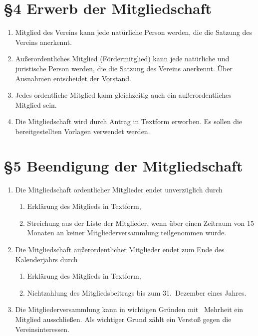 \documentclass[11pt,ngerman]{article}
\begin{document}
\section*{§4 Erwerb der Mitgliedschaft}
\begin{enumerate}
	\item Mitglied des Vereins kann jede natürliche Person werden, die die Satzung des Vereins anerkennt.
	\item Außerordentliches Mitglied (\glqq Fördermitglied\grqq) kann jede natürliche und juristische Person werden, die die Satzung des Vereins anerkennt.
	Über Ausnahmen entscheidet der Vorstand.
	\item Jedes ordentliche Mitglied kann gleichzeitig auch ein außerordentliches Mitglied sein.
	\item Die Mitgliedschaft wird durch Antrag in Textform erworben. Es sollen die bereitgestellten Vorlagen verwendet werden.
\end{enumerate}



\section*{§5 Beendigung der Mitgliedschaft}
\begin{enumerate}
 \item Die Mitgliedschaft ordentlicher Mitglieder endet unverzüglich durch
  \begin{enumerate}
      \item Erklärung des Mitglieds in Textform,
      \item Streichung aus der Liste der Mitglieder, wenn über einen Zeitraum von 15 Monaten an keiner Mitgliederversammlung teilgenommen wurde.
  \end{enumerate}
  \item Die Mitgliedschaft außerordentlicher Mitglieder endet zum Ende des Kalenderjahrs durch
  \begin{enumerate}
    \item Erklärung des Mitglieds in Textform,
    \item Nichtzahlung des Mitgliedsbeitrags bis zum 31.\, Dezember eines Jahres.
  \end{enumerate}
 \item Die Mitgliederversammlung kann in wichtigen Gründen mit \ Mehrheit ein Mitglied ausschließen. Als wichtiger Grund zählt ein Verstoß gegen die Vereinsinteressen.
\end{enumerate}
\end{document}

